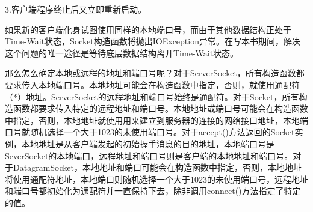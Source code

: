 	3.客户端程序终止后又立即重新启动。

	如果新的客户端化身试图使用同样的本地端口号，而由于其他数据结构正处于Time-Wait状态，Socket构造函数将抛出IOException异常。在写本书期间，解决这个问题的唯一途径是等待底层数据结构离开Time-Wait状态。

	那么怎么确定本地或远程的地址和端口号呢？对于ServerSocket，所有构造函数都要求传入本地端口号。本地地址可能会在构造函数中指定，否则，就使用通配符（*）地址。ServerSocket的远程地址和端口号始终是通配符。对于Socket，所有构造函数都要求传入特定的远程地址和端口号。本地地址或端口号可能会在构造函数中指定，否则，本地地址就使用用来建立到服务器的连接的网络接口地址，本地端口号就随机选择一个大于1023的未使用端口号。对于accept()方法返回的Socket实例，本地地址是从客户端发起的初始握手消息的目的地址，本地端口号是SeverSocket的本地端口，远程地址和端口号则是客户端的本地地址和端口号。对于DatagramSocket，本地地址和端口可能会在构造函数中指定，否则，本地地址将使用通配符地址，本地端口则随机选择一个大于1023的未使用端口号，远程地址和端口号都初始化为通配符并一直保持下去，除非调用connect()方法指定了特定的值。


